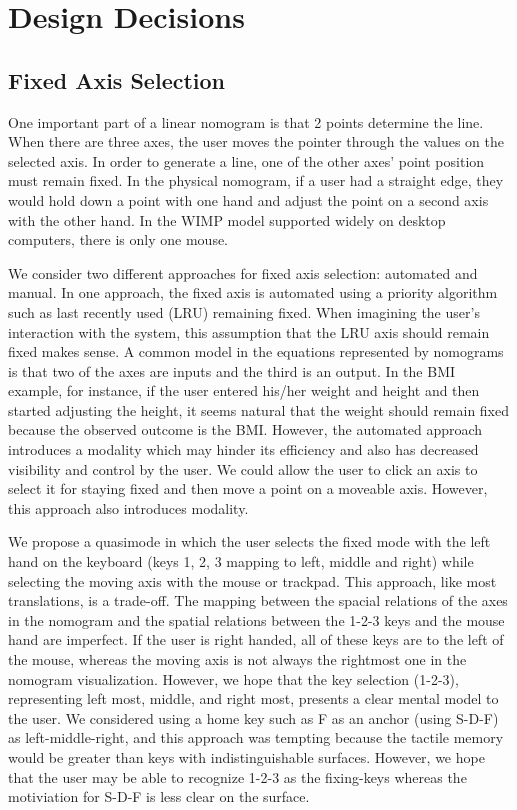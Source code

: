 \documentclass{proc}
\begin{document}
\section{Design Decisions}
\subsection{Fixed Axis Selection}
One important part of a linear nomogram is that 2 points determine the
line. When there are three axes, the user moves the pointer through
the values on the selected axis. In order to generate a line, one of
the other axes’ point position must remain fixed. In the physical
nomogram, if a user had a straight edge, they would hold down a point
with one hand and adjust the point on a second axis with the other
hand. In the WIMP model supported widely on desktop computers, there
is only one mouse.

We consider two different approaches for fixed axis selection:
automated and manual. In one approach, the fixed axis is automated
using a priority algorithm such as last recently used (LRU) remaining
fixed. When imagining the user’s interaction with the system, this
assumption that the LRU axis should remain fixed makes sense. A common
model in the equations represented by nomograms is that two of the
axes are inputs and the third is an output. In the BMI example, for
instance, if the user entered his/her weight and height and then
started adjusting the height, it seems natural that the weight should
remain fixed because the observed outcome is the BMI. However, the
automated approach introduces a modality which may hinder its
efficiency and also has decreased visibility and control by the user.
We could allow the user to click an axis to select it for staying
fixed and then move a point on a moveable axis. However, this approach
also introduces modality.

We propose a quasimode in which the user selects the fixed mode with
the left hand on the keyboard (keys 1, 2, 3 mapping to left, middle
and right) while selecting the moving axis with the mouse or trackpad.
This approach, like most translations, is a trade-off. The mapping
between the spacial relations of the axes in the nomogram and the
spatial relations between the 1-2-3 keys and the mouse hand are
imperfect. If the user is right handed, all of these keys are to the
left of the mouse, whereas the moving axis is not always the rightmost
one in the nomogram visualization. However, we hope that the key
selection (1-2-3), representing left most, middle, and right most,
presents a clear mental model to the user. We considered using a home
key such as F as an anchor (using S-D-F) as left-middle-right, and
this approach was tempting because the tactile memory would be greater
than keys with indistinguishable surfaces. However, we hope that the
user may be able to recognize 1-2-3 as the fixing-keys whereas the
motiviation for S-D-F is less clear on the surface.
\end{document}
